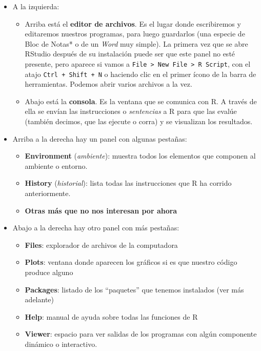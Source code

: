 \documentclass[
]{book}
\providecommand{\tightlist}{%
  \setlength{\itemsep}{0pt}\setlength{\parskip}{0pt}}
\begin{document}
\begin{itemize}
\item
  A la izquierda:

  \begin{itemize}
  \tightlist
  \item
    Arriba está el \textbf{editor de archivos}. Es el lugar donde escribiremos y editaremos nuestros programas, para luego guardarlos (una especie de Bloc de Notas* o de un \emph{Word} muy simple). La primera vez que se abre RStudio después de su instalación puede ser que este panel no esté presente, pero aparece si vamos a \texttt{File\ \textgreater{}\ New\ File\ \textgreater{}\ R\ Script}, con el atajo \texttt{Ctrl\ +\ Shift\ +\ N} o haciendo clic en el primer ícono de la barra de herramientas. Podemos abrir varios archivos a la vez.
  \item
    Abajo está la \textbf{consola}. Es la ventana que se comunica con R. A través de ella se envían las instrucciones o \emph{sentencias} a R para que las evalúe (también decimos, que las ejecute o corra) y se visualizan los resultados.
  \end{itemize}
\item
  Arriba a la derecha hay un panel con algunas pestañas:

  \begin{itemize}
  \tightlist
  \item
    \textbf{Environment} (\emph{ambiente}): muestra todos los elementos que componen al ambiente o entorno.
  \item
    \textbf{History} (\emph{historial}): lista todas las instrucciones que R ha corrido anteriormente.
  \item
    \textbf{Otras más que no nos interesan por ahora}
  \end{itemize}
\item
  Abajo a la derecha hay otro panel con más pestañas:

  \begin{itemize}
  \tightlist
  \item
    \textbf{Files}: explorador de archivos de la computadora
  \item
    \textbf{Plots}: ventana donde aparecen los gráficos si es que nuestro código produce alguno
  \item
    \textbf{Packages}: listado de los ``paquetes'' que tenemos instalados (ver más adelante)
  \item
    \textbf{Help}: manual de ayuda sobre todas las funciones de R
  \item
    \textbf{Viewer}: espacio para ver salidas de los programas con algún componente dinámico o interactivo.
  \end{itemize}
\end{itemize}
\end{document}
